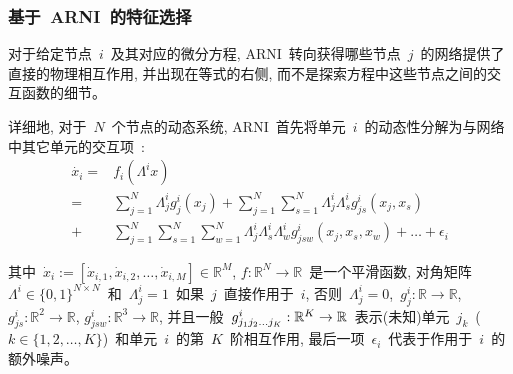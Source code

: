 \subsubsection{基于~ARNI~的特征选择}

对于给定节点~$i$~及其对应的微分方程, 
ARNI~转向获得哪些节点~$j$~的网络提供了直接的物理相互作用, 并出现在等式的右侧, 
而不是探索方程中这些节点之间的交互函数的细节。

详细地, 对于~$N$~个节点的动态系统, 
ARNI~首先将单元~$i$~的动态性分解为与网络中其它单元的交互项~\cite{casadiego2017model}:
\begin{equation}
\label{eq:xi}
\begin{split}
\dot{x_i}= & f_i(\Lambda ^i x)\\
         = &\sum_{j=1}^{N} \Lambda^i_{j} g^i_j(x_j) + 
                             \sum_{j=1}^{N} \sum_{s=1}^{N}\Lambda^i_{j}\Lambda^i_{s}g^i_{js}(x_j,x_s)\\
         + &\sum_{j=1}^{N} \sum_{s=1}^{N} \sum_{w=1}^{N}\Lambda^i_{j}\Lambda^i_{s}\Lambda^i_{w}g^i_{jsw}(x_j,x_s,x_w)+ \ldots + \epsilon_{i}
\end{split}
\end{equation}

其中~$\dot{x}_i :=[\dot{x}_{i,1}, \dot{x}_{i,2},\ldots,\dot{x}_{i,M}]\in \mathbb{R}^M$,
$f:\mathbb{R}^N \to \mathbb{R}$~是一个平滑函数, 
对角矩阵~$\Lambda^i \in \{0,1\}^{N \times N}$~和~$\Lambda^i_{j}=1$~如果~$j$~直接作用于~$i$, 
否则~$\Lambda^i_{j}=0$,~$g^i_j:\mathbb{R} \to \mathbb{R}$, $g^i_{js}:\mathbb{R}^2 \to \mathbb{R}$, $g^i_{jsw}:\mathbb{R}^3 \to \mathbb{R}$,
并且一般~$g^i_{j_{1}j_{2}\ldots\\j_{K}}:\mathbb{R}^K \to \mathbb{R}$~表示(未知)单元~$j_k$~($k \in \{1,2,\ldots,K\}$)~和单元~$i$~的第~$K$~阶相互作用, 
最后一项~$\epsilon_{i}$~代表于作用于~$i$~的额外噪声。

